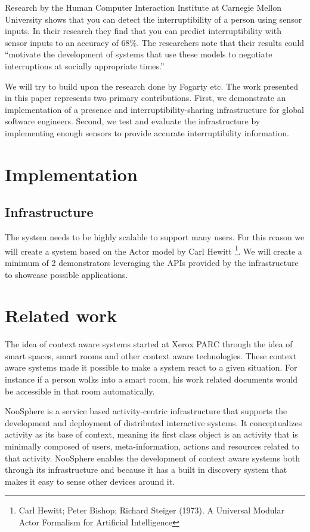 \documentclass{sigchi}
\begin{document}
Research by the Human Computer Interaction Institute at Carnegie Mellon University \cite{Fogarty:2005:PHI:1057237.1057243} shows that you can detect the interruptibility of a person using sensor inputs.
In their research they find that you can predict interruptibility with sensor inputs to an accuracy of 68\%.
The researchers note that their results could ``motivate the development of systems that use these models to negotiate interruptions at socially appropriate times.''

We will try to build upon the research done by Fogarty etc.
The work presented in this paper represents two primary contributions.
First, we demonstrate an implementation of a presence and interruptibility-sharing infrastructure for global software engineers.
Second, we test and evaluate the infrastructure by implementing enough sensors to provide accurate interruptibility information.

\section{Implementation}
\subsection{Infrastructure}
The system needs to be highly scalable to support many users.
For this reason we will create a system based on the Actor model by Carl Hewitt \footnote{Carl Hewitt; Peter Bishop; Richard Steiger (1973). A Universal Modular Actor Formalism for Artificial Intelligence}.
We will create a minimum of 2 demonstrators leveraging the APIs provided by the infrastructure to showcase possible applications.

\section{Related work}
The idea of context aware systems started at Xerox PARC through the idea of smart spaces, smart rooms and other context aware technologies.
These context aware systems made it possible to make a system react to a given situation.
For instance if a person walks into a smart room, his work related documents would be accessible in that room automatically.

NooSphere \cite{houben2013noosphere} is a service based activity-centric infrastructure that supports the development and deployment of distributed interactive systems.
It conceptualizes activity as its base of context, meaning its first class object is an activity that is minimally composed of users, meta-information, actions and resources related to that activity.
NooSphere enables the development of context aware systems both through its infrastructure and because it has a built in discovery system that makes it easy to sense other devices around it.
\end{document}
